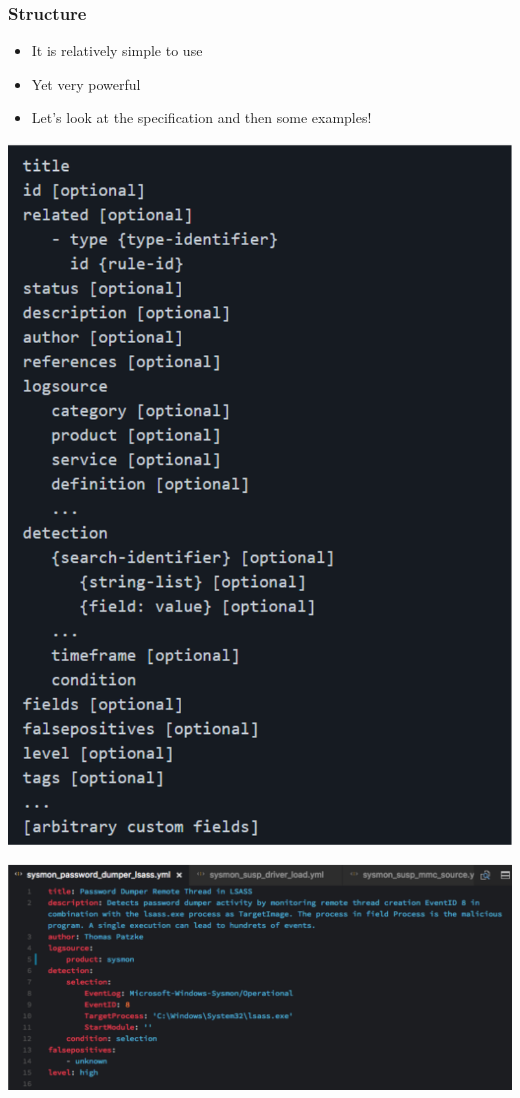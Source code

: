 \subsubsection*{Structure}
\begin{itemize}
  \item It is relatively simple to use
  \item Yet very powerful
  \item Let’s look at the specification and then some examples!
\end{itemize}
\begin{center}
\includegraphics{resources/12-sigma-structure.png}
\end{center}

\begin{center}
\includegraphics[width=\textwidth]{resources/12-sigma-detection-rules.png}
\end{center}

